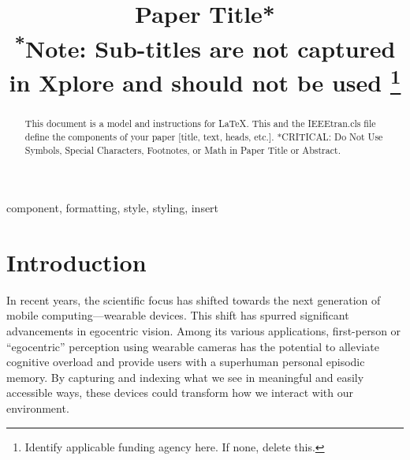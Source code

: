 \documentclass[conference]{IEEEtran}
\begin{document}
\title{Paper Title*\\
{\footnotesize \textsuperscript{*}Note: Sub-titles are not captured in Xplore and
should not be used}
\thanks{Identify applicable funding agency here. If none, delete this.}
}

\author{
\and
{}
\and
{}
}

\maketitle

\begin{abstract}
This document is a model and instructions for \LaTeX.
This and the IEEEtran.cls file define the components of your paper [title, text, heads, etc.]. *CRITICAL: Do Not Use Symbols, Special Characters, Footnotes, 
or Math in Paper Title or Abstract.
\end{abstract}

\begin{IEEEkeywords}
component, formatting, style, styling, insert
\end{IEEEkeywords}

\section{Introduction}
In recent years, the scientific focus has shifted towards the next generation of mobile computing—wearable devices. This shift has spurred significant advancements in egocentric vision. Among its various applications, first-person or “egocentric” perception using wearable cameras has the potential to alleviate cognitive overload and provide users with a superhuman personal episodic memory. By capturing and indexing what we see in meaningful and easily accessible ways, these devices could transform how we interact with our environment.
\end{document}
